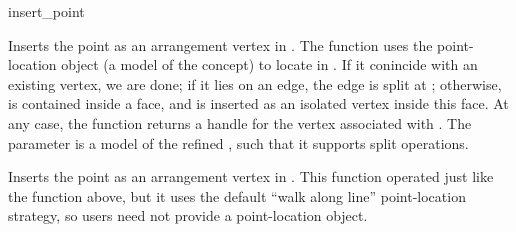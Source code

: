 
\ccRefPageBegin

\begin{ccRefFunction}{insert_point}


   {Inserts the point  as an arrangement vertex in .
    The function uses the point-location object  (a model of the
     concept) to locate  in .
    If it conincide with an existing vertex, we are done; if it lies on an
    edge, the edge is split at ; otherwise,  is contained inside
    a face, and is inserted as an isolated vertex inside this face.
    At any case, the function returns a handle for the vertex associated
    with . The  parameter is a model of the refined
    , such that it supports split operations.
    }

   {Inserts the point  as an arrangement vertex in .
    This function operated just like the function above, but it uses the
    default ``walk along line'' point-location strategy, so users need not
    provide a point-location object.} 

\end{ccRefFunction}

\ccRefPageEnd
